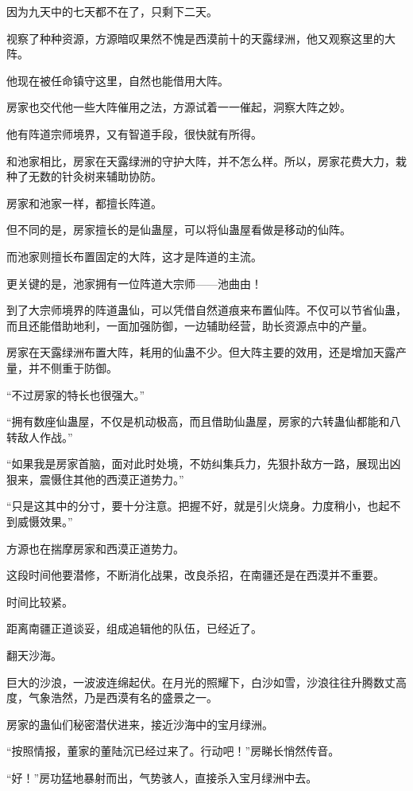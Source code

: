 \begin{this_body}
因为九天中的七天都不在了，只剩下二天。

视察了种种资源，方源暗叹果然不愧是西漠前十的天露绿洲，他又观察这里的大阵。

他现在被任命镇守这里，自然也能借用大阵。

房家也交代他一些大阵催用之法，方源试着一一催起，洞察大阵之妙。

他有阵道宗师境界，又有智道手段，很快就有所得。

和池家相比，房家在天露绿洲的守护大阵，并不怎么样。所以，房家花费大力，栽种了无数的针灸树来辅助协防。

房家和池家一样，都擅长阵道。

但不同的是，房家擅长的是仙蛊屋，可以将仙蛊屋看做是移动的仙阵。

而池家则擅长布置固定的大阵，这才是阵道的主流。

更关键的是，池家拥有一位阵道大宗师——池曲由！

到了大宗师境界的阵道蛊仙，可以凭借自然道痕来布置仙阵。不仅可以节省仙蛊，而且还能借助地利，一面加强防御，一边辅助经营，助长资源点中的产量。

房家在天露绿洲布置大阵，耗用的仙蛊不少。但大阵主要的效用，还是增加天露产量，并不侧重于防御。

“不过房家的特长也很强大。”

“拥有数座仙蛊屋，不仅是机动极高，而且借助仙蛊屋，房家的六转蛊仙都能和八转敌人作战。”

“如果我是房家首脑，面对此时处境，不妨纠集兵力，先狠扑敌方一路，展现出凶狠来，震慑住其他的西漠正道势力。”

“只是这其中的分寸，要十分注意。把握不好，就是引火烧身。力度稍小，也起不到威慑效果。”

方源也在揣摩房家和西漠正道势力。

这段时间他要潜修，不断消化战果，改良杀招，在南疆还是在西漠并不重要。

时间比较紧。

距离南疆正道谈妥，组成追辑他的队伍，已经近了。

翻天沙海。

巨大的沙浪，一波波连绵起伏。在月光的照耀下，白沙如雪，沙浪往往升腾数丈高度，气象浩然，乃是西漠有名的盛景之一。

房家的蛊仙们秘密潜伏进来，接近沙海中的宝月绿洲。

“按照情报，董家的董陆沉已经过来了。行动吧！”房睇长悄然传音。

“好！”房功猛地暴射而出，气势骇人，直接杀入宝月绿洲中去。


\end{this_body}
